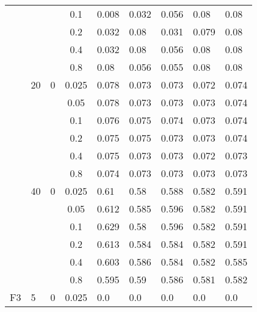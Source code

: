 \begin{longtable}{|l|l|l|c|l|l|l|l|l|}
\cmidrule{4-9} &     &          & 0.1            & 0.008      & 0.032      & 0.056      & 0.08       & 0.08       \\
\cmidrule{4-9} &     &          & 0.2            & 0.032      & 0.08       & 0.031      & 0.079      & 0.08       \\
\cmidrule{4-9} &     &          & 0.4            & 0.032      & 0.08       & 0.056      & 0.08       & 0.08       \\
\cmidrule{4-9} &     &          & 0.8            & 0.08       & 0.056      & 0.055      & 0.08       & 0.08       \\
\cmidrule{2-9} & 20  & 0        & 0.025          & 0.078      & 0.073      & 0.073      & 0.072      & 0.074      \\
\cmidrule{4-9} &     &          & 0.05           & 0.078      & 0.073      & 0.073      & 0.073      & 0.074      \\
\cmidrule{4-9} &     &          & 0.1            & 0.076      & 0.075      & 0.074      & 0.073      & 0.074      \\
\cmidrule{4-9} &     &          & 0.2            & 0.075      & 0.075      & 0.073      & 0.073      & 0.074      \\
\cmidrule{4-9} &     &          & 0.4            & 0.075      & 0.073      & 0.073      & 0.072      & 0.073      \\
\cmidrule{4-9} &     &          & 0.8            & 0.074      & 0.073      & 0.073      & 0.073      & 0.073      \\
\cmidrule{2-9} & 40  & 0        & 0.025          & 0.61       & 0.58       & 0.588      & 0.582      & 0.591      \\
\cmidrule{4-9} &     &          & 0.05           & 0.612      & 0.585      & 0.596      & 0.582      & 0.591      \\
\cmidrule{4-9} &     &          & 0.1            & 0.629      & 0.58       & 0.596      & 0.582      & 0.591      \\
\cmidrule{4-9} &     &          & 0.2            & 0.613      & 0.584      & 0.584      & 0.582      & 0.591      \\
\cmidrule{4-9} &     &          & 0.4            & 0.603      & 0.586      & 0.584      & 0.582      & 0.585      \\
\cmidrule{4-9} &     &          & 0.8            & 0.595      & 0.59       & 0.586      & 0.581      & 0.582      \\ \midrule
F3             & 5   & 0        & 0.025          & 0.0        & 0.0        & 0.0        & 0.0        & 0.0        \\

\end{longtable}

